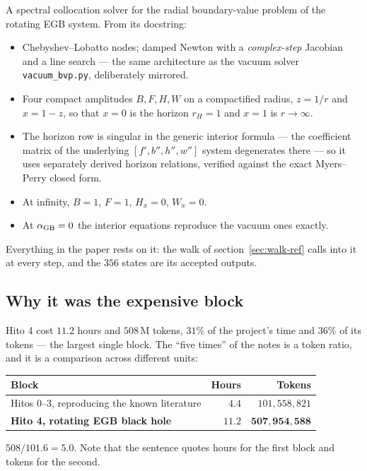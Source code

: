 \documentclass[11pt,a4paper]{article}
\newcommand{\q}[1]{\subsection*{\color{accent}#1}}
\begin{document}
A spectral collocation solver for the radial boundary-value problem of the
rotating EGB system. From its docstring:
\begin{itemize}\itemsep1pt
  \item Chebyshev--Lobatto nodes; damped Newton with a \emph{complex-step}
  Jacobian and a line search --- the same architecture as the vacuum solver
  \texttt{vacuum\_bvp.py}, deliberately mirrored.
  \item Four compact amplitudes $B,F,H,W$ on a compactified radius, $z=1/r$ and
  $x=1-z$, so that $x=0$ is the horizon $r_H=1$ and $x=1$ is $r\to\infty$.
  \item The horizon row is singular in the generic interior formula --- the
  coefficient matrix of the underlying $[f',b'',h'',w'']$ system degenerates
  there --- so it uses separately derived horizon relations, verified against
  the exact Myers--Perry closed form.
  \item At infinity, $B=1$, $F=1$, $H_x=0$, $W_x=0$.
  \item At $\alpha_{\rm GB}=0$ the interior equations reproduce the vacuum ones
  exactly.
\end{itemize}
Everything in the paper rests on it: the walk of section~\ref{sec:walk-ref}
calls into it at every step, and the $356$ states are its accepted outputs.

\q{Why it was the expensive block}

Hito 4 cost $11.2$ hours and $508$\,M tokens, $31\%$ of the project's time and
$36\%$ of its tokens --- the largest single block. The ``five times'' of the
notes is a token ratio, and it is a comparison across different units:

\begin{center}\small
\begin{tabular}{@{}lrr@{}}
\toprule
Block & Hours & Tokens \\
\midrule
Hitos 0--3, reproducing the known literature & $4.4$ & $101{,}558{,}821$ \\
\textbf{Hito 4, rotating EGB black hole} & $\mathbf{11.2}$ & $\mathbf{507{,}954{,}588}$ \\
\bottomrule
\end{tabular}
\end{center}

\noindent $508/101.6=5.0$. Note that the sentence quotes hours for the first
block and tokens for the second.
\end{document}
